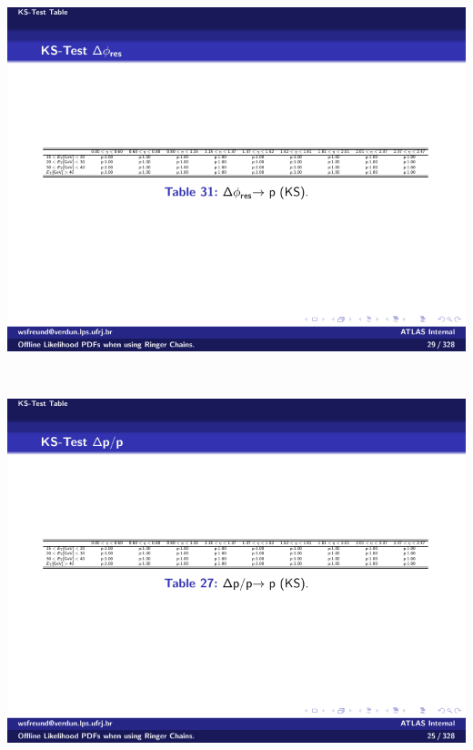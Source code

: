 \begin{table}[p]
\begin{subtable}{\textwidth}
\includegraphics[width=\textwidth]{appendices/figures/gof/deltaphi_ks_table}
\end{subtable} \\
\begin{subtable}{\textwidth}
\caption{\deltapoverp{}\label{tab:gof_ks_p_values_poverp}}
\includegraphics[width=\textwidth]{appendices/figures/gof/deltapoverp_ks_table.pdf}
\end{subtable} \\
\begin{subtable}{\textwidth}
\caption{\trackdO{}\label{tab:gof_ks_p_values_d0}}

\end{subtable}
\end{table}
